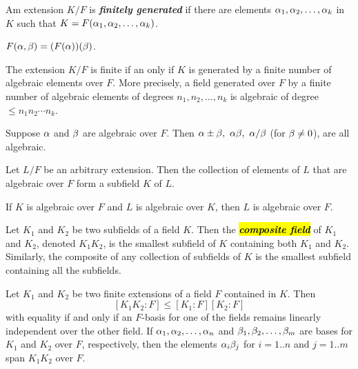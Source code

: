 \nl

\begin{defn}
Am extension $K/F$ is \textbf{\textit{finitely generated}} if there are elements $\alpha_1,\alpha_2,\ldots,\alpha_k$ in $K$ such that $K = F(\alpha_1,\alpha_2,\ldots,\alpha_k)$.
\end{defn}

\nl

\begin{lem}
$F(\alpha,\beta)= (F(\alpha))(\beta)$.
\end{lem}

\nl

\begin{thm}
The extension $K/F$ is finite if an only if $K$ is generated by a finite number of algebraic elements over $F$. More precisely, a field generated over $F$ by a finite number of algebraic elements of degrees $n_1,n_2,\ldots, n_k$ is algebraic of degree $\leq n_1n_2\cdots n_k$.
\end{thm}

\nl

\begin{cor}
Suppose $\alpha$ and $\beta$ are algebraic over $F$. Then $\alpha\pm\beta,\ \alpha\beta,\ \alpha/\beta$ (for $\beta\neq 0$), are all algebraic.
\end{cor}

\nl

\begin{cor}
Let $L/F$ be an arbitrary extension. Then the collection of elements of $L$ that are algebraic over $F$ form a subfield $K$ of $L$.
\end{cor}

\nl

\begin{thm}
If $K$ is algebraic over $F$ and $L$ is algebraic over $K$, then $L$ is algebraic over $F$.
\end{thm}

\nl

\begin{defn}
Let $K_1$ and $K_2$ be two subfields of a field $K$. Then the \hl{\textit{\textbf{composite field}}} of $K_1$ and $K_2$, denoted $K_1K_2$, is the smallest subfield of $K$ containing both $K_1$ and $K_2$. Similarly, the composite of any collection of subfields of $K$ is the smallest subfield containing all the subfields.
\end{defn}

\nl

\begin{prop}
Let $K_1$ and $K_2$ be two finite extensions of a field $F$ contained in $K$. Then
\[[K_1K_2:F]\leq[K_1:F][K_2:F]\]
with equality if and only if an $F$-basis for one of the fields remains linearly independent over the other field. If $\alpha_1,\alpha_2,\ldots,\alpha_n$ and $\beta_1,\beta_2,\ldots,\beta_m$ are bases for $K_1$ and $K_2$ over $F$, respectively, then the elements $\alpha_i\beta_j$ for $i = 1..n$ and $j = 1..m$ span $K_1K_2$ over $F$.
\end{prop}

